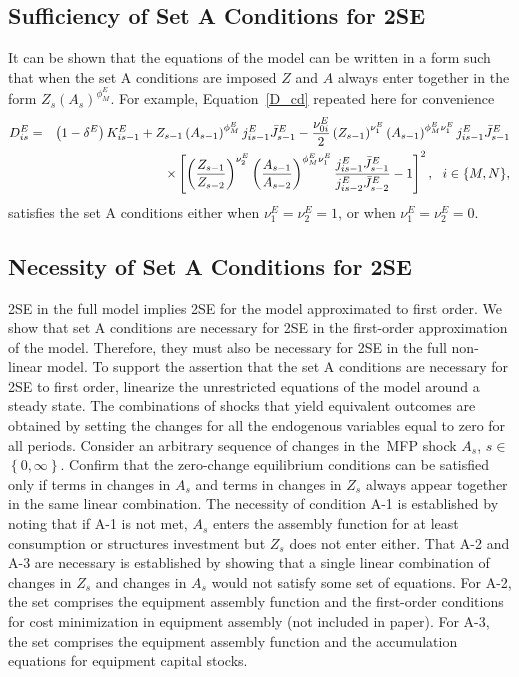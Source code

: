 \documentclass[12pt,fleqn]{article}
\begin{document}
\subsection{Sufficiency of Set A Conditions for 2SE}

It can be shown that the equations of the model can be written in a form
such that when the set A conditions are imposed $Z$ and $A$ always enter
together in the form $Z_{s}\left( A_{s}\right) ^{\phi _{M}^{E}}$. For
example, Equation~\ref{D_cd} repeated here for convenience
\begin{eqnarray}
D_{is}^{E} &=&\left( 1-\delta ^{E}\right) K_{is-1}^{E}+Z_{s-1}\left(
A_{s-1}\right) ^{\phi _{M}^{E}}j_{is-1}^{E}\bar{J}_{s-1}^{E}-\frac{\nu
_{0i}^{E}}{2}\left( Z_{s-1}\right) ^{\nu _{1}^{E}}\left( A_{s-1}\right)
^{\phi _{M}^{E}\nu _{1}^{E}}j_{is-1}^{E}\bar{J}_{s-1}^{E}  \notag \\
&&\times \left[ \left( \frac{Z_{s-1}}{Z_{s-2}}\right) ^{\nu _{2}^{E}}\left(
\frac{A_{s-1}}{A_{s-2}}\right) ^{\phi _{M}^{E}\nu _{1}^{E}}\frac{j_{is-1}^{E}%
\bar{J}_{s-1}^{E}}{j_{is-2}^{E}\bar{J}_{s-2}^{E}}-1\right] ^{2},\,\,\,\,i\in
\{M,N\},  \notag
\end{eqnarray}%
satisfies the set A conditions either when $\nu _{1}^{E}=\nu _{2}^{E}=1$, or
when $\nu _{1}^{E}=\nu _{2}^{E}=0$.

\subsection{Necessity of Set A Conditions for 2SE}

2SE in the full model implies 2SE for the model approximated to first order.
We show that set A conditions are necessary for 2SE in the first-order
approximation of the model. Therefore, they must also be necessary for 2SE
in the full non-linear model. To support the assertion that the set A
conditions are necessary for 2SE to first order, linearize the unrestricted
equations of the model around a steady state. The combinations of shocks
that yield equivalent outcomes are obtained by setting the changes for all
the endogenous variables equal to zero for all periods. Consider an
arbitrary sequence of changes in the\ MFP shock $A_{s}$, $s\in $ $\left\{
0,\infty \right\} .$ Confirm that the zero-change equilibrium conditions can
be satisfied only if terms in changes in $A_{s}$ and terms in changes in $%
Z_{s}$ always appear together in the same linear combination. The necessity
of condition A-1 is established by noting that if A-1 is not met, $A_{s}$
enters the assembly function for at least consumption or structures
investment but $Z_{s}$ does not enter either. That A-2 and A-3 are necessary
is established by showing that a single linear combination of changes in $%
Z_{s}$ and changes in $A_{s}$ would not satisfy some set of equations. For
A-2, the set comprises the equipment assembly function and the first-order
conditions for cost minimization in equipment assembly (not included in
paper). For A-3, the set comprises the equipment assembly function and the
accumulation equations for equipment capital stocks.
\end{document}
